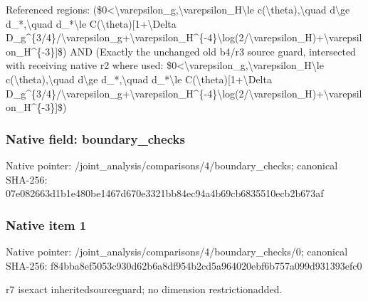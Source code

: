 \documentclass[10pt,a4paper]{article}
\begin{document}
\begingroup\raggedright\sloppy Referenced regions:\allowbreak{} (\$0<\textbackslash{}varepsilon\_\allowbreak{}g,\allowbreak{}\textbackslash{}varepsilon\_\allowbreak{}H\textbackslash{}le c(\textbackslash{}theta),\allowbreak{}\textbackslash{}quad d\textbackslash{}ge d\_\allowbreak{}*,\allowbreak{}\textbackslash{}quad d\_\allowbreak{}*\textbackslash{}le C(\textbackslash{}theta)[1+\textbackslash{}Delta D\_\allowbreak{}g\textasciicircum{}\{3/\allowbreak{}4\}/\allowbreak{}\textbackslash{}varepsilon\_\allowbreak{}g+\textbackslash{}varepsilon\_\allowbreak{}H\textasciicircum{}\{-4\}\textbackslash{}log(2/\allowbreak{}\textbackslash{}varepsilon\_\allowbreak{}H)+\textbackslash{}varepsilon\_\allowbreak{}H\textasciicircum{}\{-3\}]\$) AND (Exactly the unchanged old b4/\allowbreak{}r3 source guard,\allowbreak{} intersected with receiving native r2 where used:\allowbreak{} \$0<\textbackslash{}varepsilon\_\allowbreak{}g,\allowbreak{}\textbackslash{}varepsilon\_\allowbreak{}H\textbackslash{}le c(\textbackslash{}theta),\allowbreak{}\textbackslash{}quad d\textbackslash{}ge d\_\allowbreak{}*,\allowbreak{}\textbackslash{}quad d\_\allowbreak{}*\textbackslash{}le C(\textbackslash{}theta)[1+\textbackslash{}Delta D\_\allowbreak{}g\textasciicircum{}\{3/\allowbreak{}4\}/\allowbreak{}\textbackslash{}varepsilon\_\allowbreak{}g+\textbackslash{}varepsilon\_\allowbreak{}H\textasciicircum{}\{-4\}\textbackslash{}log(2/\allowbreak{}\textbackslash{}varepsilon\_\allowbreak{}H)+\textbackslash{}varepsilon\_\allowbreak{}H\textasciicircum{}\{-3\}]\$)\par\endgroup

\subsubsection{Native field: boundary\_\allowbreak{}checks}
Native pointer: /joint\_\allowbreak{}analysis/comparisons/4/boundary\_\allowbreak{}checks; canonical SHA-256: 07e082663d1b1e480be1467d670e3321bb84ec94a4b69cb6835510ecb2b673af

\subsubsection{Native item 1}
Native pointer: /joint\_\allowbreak{}analysis/comparisons/4/boundary\_\allowbreak{}checks/0; canonical SHA-256: f84bba8ef5053c930d62b6a8df954b2cd5a964020ebf6b757a099d931393efc0

\begingroup\raggedright\sloppy r7 isexact inheritedsourceguard;\allowbreak{} no dimension restrictionadded.\par\endgroup
\end{document}
